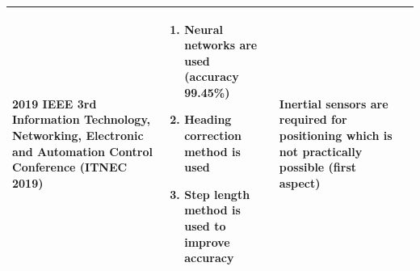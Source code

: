 \documentclass[a4paper, 12pt]{article}
\begin{document}
\begin{tabular}{|p{107pt}|p{107pt}|p{107pt}|p{107pt}|}
	\parbox{107pt}{\raggedright 2019 IEEE 3rd Information Technology, Networking, Electronic and Automation Control Conference (ITNEC 2019)} & 
	\parbox{107pt}{\raggedright 
		\begin{enumerate}
			\item Neural networks are used (accuracy 99.45\%)
			\item Heading correction method is used
			\item Step length method is used to improve accuracy
	\end{enumerate}} & 
	\parbox{107pt}{\raggedright Inertial sensors are required for positioning which is not practically possible (first aspect)} \\
	\hline
\end{tabular}
\vspace{2pt}

\pagebreak
\end{document}
